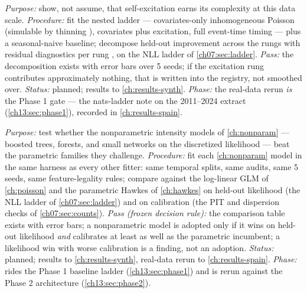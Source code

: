 \begin{protocol}
\label{chcp:prot:b2}
\emph{Purpose:} show, not assume, that self-excitation earns its complexity at this data scale.
\emph{Procedure:} fit the nested ladder --- covariates-only inhomogeneous Poisson (simulable by thinning
\citep{lewisshedler1979}), covariates plus excitation, full event-time timing --- plus a seasonal-naive
baseline; decompose held-out improvement across the rungs with residual diagnostics per rung \citep{ogata1988},
on the NLL ladder of \cref{ch07:sec:ladder}. \emph{Pass:} the decomposition exists with error bars over 5
seeds; if the excitation rung contributes approximately nothing, that is written into the registry, not
smoothed over. \emph{Status:} planned; results to \cref{ch:results-synth}. \emph{Phase:} the real-data rerun
\emph{is} the Phase 1 gate --- the nats-ladder note on the 2011--2024 extract (\cref{ch13:sec:phase1}),
recorded in \cref{ch:results-spain}.
\end{protocol}

\begin{protocol}
\label{chcp:prot:b3}
\emph{Purpose:} test whether the nonparametric intensity models of \cref{ch:nonparam} --- boosted trees,
forests, and small networks on the discretized likelihood --- beat the parametric families they challenge.
\emph{Procedure:} fit each \cref{ch:nonparam} model in the same harness as every other fitter: same temporal
splits, same audits, same 5 seeds, same feature-legality rules; compare against the log-linear GLM of
\cref{ch:poisson} and the parametric Hawkes of \cref{ch:hawkes} on held-out likelihood (the NLL ladder of
\cref{ch07:sec:ladder}) and on calibration (the PIT and dispersion checks of \cref{ch07:sec:counts}).
\emph{Pass (frozen decision rule):} the comparison table exists with error bars; a nonparametric model is
adopted only if it wins on held-out likelihood \emph{and} calibrates at least as well as the parametric
incumbent; a likelihood win with worse calibration is a finding, not an adoption. \emph{Status:} planned;
results to \cref{ch:results-synth}, real-data rerun to \cref{ch:results-spain}. \emph{Phase:} rides the
Phase 1 baseline ladder (\cref{ch13:sec:phase1}) and is rerun against the Phase 2 architecture
(\cref{ch13:sec:phase2}).
\end{protocol}

